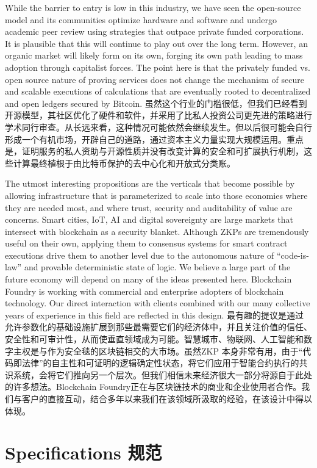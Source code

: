 \documentclass{ctexart}
\begin{document}
While the barrier to entry is low in this industry, we have seen the open-source model and its communities optimize hardware and software and undergo academic peer review using strategies  that outpace private funded corporations. It is plausible that this will continue to play out over the long term. However, an organic market will likely form on its own, forging its own path leading to mass adoption through capitalist forces. The point here is that the privately funded vs. open source nature of proving services does not change the mechanism of secure and scalable executions of calculations that are eventually rooted to decentralized and open ledgers secured by Bitcoin. 虽然这个行业的门槛很低，但我们已经看到开源模型，其社区优化了硬件和软件，并采用了比私人投资公司更先进的策略进行学术同行审查。从长远来看，这种情况可能依然会继续发生。但以后很可能会自行形成一个有机市场，开辟自己的道路，通过资本主义力量实现大规模运用。重点是，证明服务的私人资助与开源性质并没有改变计算的安全和可扩展执行机制，这些计算最终植根于由比特币保护的去中心化和开放式分类账。

The utmost interesting propositions are the verticals that become possible by allowing infrastructure that is parameterized to scale into those economies where they are needed most, and where trust, security and auditability of value are concerns. Smart cities, IoT, AI and digital sovereignty are large markets that intersect with blockchain as a security blanket. Although ZKPs are tremendously useful on their own, applying them to consensus systems for smart contract executions drive them to another level due to the autonomous nature of “code-is-law” and provable deterministic state of logic. We believe a large part of the future economy will depend on many of the ideas presented here. Blockchain Foundry is working with commercial and enterprise adopters of blockchain technology. Our direct interaction with clients combined with our many collective years of experience in this field are reflected in this design. 最有趣的提议是通过允许参数化的基础设施扩展到那些最需要它们的经济体中，并且关注价值的信任、安全性和可审计性，从而使垂直领域成为可能。智慧城市、物联网、人工智能和数字主权是与作为安全毯的区块链相交的大市场。虽然ZKP 本身非常有用，由于“代码即法律”的自主性和可证明的逻辑确定性状态，将它们应用于智能合约执行的共识系统，会将它们推向另一个层次。但我们相信未来经济很大一部分将源自于此处的许多想法。Blockchain Foundry正在与区块链技术的商业和企业使用者合作。我们与客户的直接互动，结合多年以来我们在该领域所汲取的经验，在该设计中得以体现。

\section{Specifications 规范}
\label{section:specs}
\end{document}
